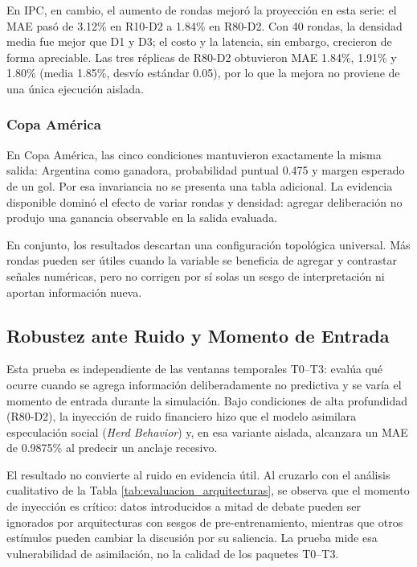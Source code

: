 ﻿\documentclass{article}
\begin{document}
En IPC, en cambio, el aumento de rondas mejoró la proyección en esta serie: el MAE pasó de 3.12\% en R10-D2 a 1.84\% en R80-D2. Con 40 rondas, la densidad media fue mejor que D1 y D3; el costo y la latencia, sin embargo, crecieron de forma apreciable. Las tres réplicas de R80-D2 obtuvieron MAE 1.84\%, 1.91\% y 1.80\% (media 1.85\%, desvío estándar 0.05), por lo que la mejora no proviene de una única ejecución aislada.

\subsubsection{Copa América}

En Copa América, las cinco condiciones mantuvieron exactamente la misma salida: Argentina como ganadora, probabilidad puntual 0.475 y margen esperado de un gol. Por esa invariancia no se presenta una tabla adicional. La evidencia disponible dominó el efecto de variar rondas y densidad: agregar deliberación no produjo una ganancia observable en la salida evaluada.

En conjunto, los resultados descartan una configuración topológica universal. Más rondas pueden ser útiles cuando la variable se beneficia de agregar y contrastar señales numéricas, pero no corrigen por sí solas un sesgo de interpretación ni aportan información nueva.

\subsection{Robustez ante Ruido y Momento de Entrada}

Esta prueba es independiente de las ventanas temporales T0--T3: evalúa qué ocurre cuando se agrega información deliberadamente no predictiva y se varía el momento de entrada durante la simulación. Bajo condiciones de alta profundidad (R80-D2), la inyección de ruido financiero hizo que el modelo asimilara especulación social (\textit{Herd Behavior}) y, en esa variante aislada, alcanzara un MAE de 0.9875\% al predecir un anclaje recesivo.

El resultado no convierte al ruido en evidencia útil. Al cruzarlo con el análisis cualitativo de la Tabla \ref{tab:evaluacion_arquitecturas}, se observa que el momento de inyección es crítico: datos introducidos a mitad de debate pueden ser ignorados por arquitecturas con sesgos de pre-entrenamiento, mientras que otros estímulos pueden cambiar la discusión por su saliencia. La prueba mide esa vulnerabilidad de asimilación, no la calidad de los paquetes T0--T3.
\end{document}
